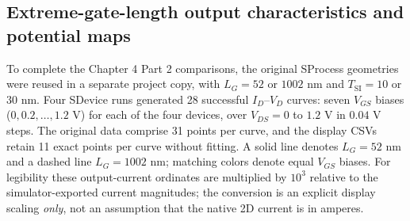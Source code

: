\subsection{Extreme-gate-length output characteristics and potential maps}
\label{sec:part2_remaining}
To complete the Chapter 4 Part 2 comparisons, the original SProcess geometries
were reused in a separate project copy, with $L_G=52$ or $1002$ nm and
$T_{\mathrm{SI}}=10$ or $30$ nm. Four SDevice runs generated 28 successful
$I_D$--$V_D$ curves: seven $V_{GS}$ biases ($0,0.2,\ldots,1.2$ V)
for each of the four devices, over $V_{DS}=0$ to $1.2$ V in
$0.04$ V steps. The original data comprise 31 points per curve,
and the display CSVs retain 11 exact points per curve without fitting.
A solid line denotes $L_G=52$ nm and a dashed line $L_G=1002$ nm;
matching colors denote equal $V_{GS}$ biases.
For legibility these output-current ordinates are multiplied by
$10^3$ relative to the simulator-exported current magnitudes;
the conversion is an explicit display scaling \emph{only},
not an assumption that the native 2D current is in amperes.

